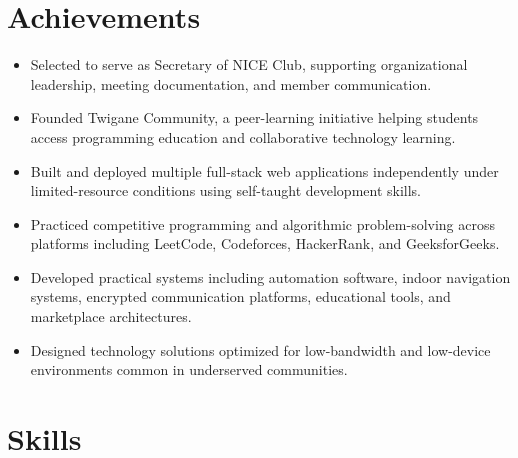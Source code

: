 \documentclass[a4paper,12pt]{article}
\begin{document}

\section{Achievements}

\begin{itemize}[leftmargin=1em]

\item Selected to serve as Secretary of NICE Club, supporting organizational leadership, meeting documentation, and member communication.

\item Founded Twigane Community, a peer-learning initiative helping students access programming education and collaborative technology learning.

\item Built and deployed multiple full-stack web applications independently under limited-resource conditions using self-taught development skills.

\item Practiced competitive programming and algorithmic problem-solving across platforms including LeetCode, Codeforces, HackerRank, and GeeksforGeeks.

\item Developed practical systems including automation software, indoor navigation systems, encrypted communication platforms, educational tools, and marketplace architectures.

\item Designed technology solutions optimized for low-bandwidth and low-device environments common in underserved communities.

\end{itemize}


\section{Skills}
\end{document}
